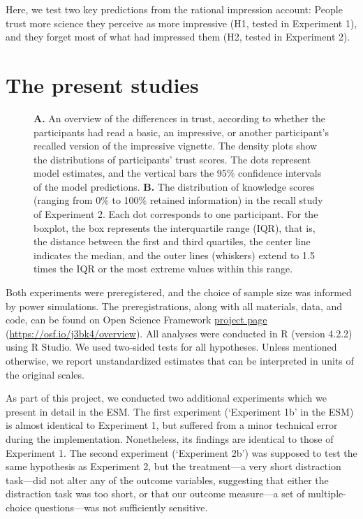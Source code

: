 \documentclass[
  english,
  doc,floatsintext]{apa6}
\makeatletter
\newcommand*\pandocbounded[1]{%
  \sbox\pandoc@box{#1}%
  \Gscale@div\@tempa{\textheight}{\dimexpr\ht\pandoc@box+\dp\pandoc@box\relax}%
  \Gscale@div\@tempb{\linewidth}{\wd\pandoc@box}%
  \ifdim\@tempb\p@<\@tempa\p@\let\@tempa\@tempb\fi%
  \ifdim\@tempa\p@<\p@\scalebox{\@tempa}{\usebox\pandoc@box}%
  \else\usebox{\pandoc@box}%
  \fi%
}
\makeatother
\begin{document}
Here, we test two key predictions from the rational impression account: People trust more science they perceive as more impressive (H1, tested in Experiment 1), and they forget most of what had impressed them (H2, tested in Experiment 2).

\section{The present studies}\label{the-present-studies}



\begin{figure}
\centering
\pandocbounded{\texttt{[image: output/figures/overview-plot.pdf]}}
\caption{\label{fig:overview-plot}\textbf{A.} An overview of the differences in trust, according to whether the participants had read a basic, an impressive, or another participant's recalled version of the impressive vignette. The density plots show the distributions of participants' trust scores. The dots represent model estimates, and the vertical bars the 95\% confidence intervals of the model predictions. \textbf{B.} The distribution of knowledge scores (ranging from 0\% to 100\% retained information) in the recall study of Experiment 2. Each dot corresponds to one participant. For the boxplot, the box represents the interquartile range (IQR), that is, the distance between the first and third quartiles, the center line indicates the median, and the outer lines (whiskers) extend to 1.5 times the IQR or the most extreme values within this range.}
\end{figure}

Both experiments were preregistered, and the choice of sample size was informed by power simulations. The preregistrations, along with all materials, data, and code, can be found on Open Science Framework \href{https://osf.io/j3bk4/overview}{project page} (\url{https://osf.io/j3bk4/overview}). All analyses were conducted in R (version 4.2.2) using R Studio. We used two-sided tests for all hypotheses. Unless mentioned otherwise, we report unstandardized estimates that can be interpreted in units of the original scales.

As part of this project, we conducted two additional experiments which we present in detail in the ESM. The first experiment (`Experiment 1b' in the ESM) is almost identical to Experiment 1, but suffered from a minor technical error during the implementation. Nonetheless, its findings are identical to those of Experiment 1. The second experiment (`Experiment 2b') was supposed to test the same hypothesis as Experiment 2, but the treatment---a very short distraction task---did not alter any of the outcome variables, suggesting that either the distraction task was too short, or that our outcome measure---a set of multiple-choice questions---was not sufficiently sensitive.
\end{document}
